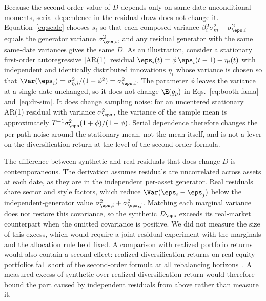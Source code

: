 Because the second-order value of $D$ depends only on same-date
unconditional moments, serial dependence in the residual draw does not
change it. Equation~\eqref{eq:scale} chooses $s_i$ so that each
composed variance $\beta_i^2\sigma_m^2+\sigma_{\eps,i}^2$ equals the
generator variance $\sigma_{\gen,i}^2$, and any residual generator
with the same same-date variances gives the same $D$. As an
illustration, consider a stationary first-order autoregressive
[AR(1)] residual $\eps_i(t) = \phi\, \eps_i(t-1) + \eta_i(t)$ with
independent and identically distributed innovations $\eta_i$ whose
variance is chosen so that
$\Var(\eps_i) = \sigma_{\eta,i}^2 / (1 - \phi^2) = \sigma_{\eps,i}^2$.
The parameter $\phi$ leaves the variance at a single date unchanged,
so it does not change $\E(g_p)$ in Eqs.~\eqref{eq:booth-fama}
and~\eqref{eq:dr-sim}. It does change sampling noise: for an
uncentered stationary AR(1) residual with variance $\sigma_\eps^2$,
the variance of the sample mean is approximately
$T^{-1}\sigma_\eps^2(1+\phi)/(1-\phi)$. Serial dependence therefore
changes the per-path noise around the stationary mean, not the mean
itself, and is not a lever on the diversification return at the level
of the second-order formula.

The difference between synthetic and real residuals that does change
$D$ is contemporaneous. The derivation assumes residuals are
uncorrelated across assets at each date, as they are in the
independent per-asset generator. Real residuals share sector and style
factors, which reduce $\Var(\eps_i-\eps_j)$ below the
independent-generator value $\sigma_{\eps,i}^2+\sigma_{\eps,j}^2$.
Matching each marginal variance does not restore this covariance, so
the synthetic $D_\eps$ exceeds its real-market counterpart when the
omitted covariance is positive. We did not measure the size of this
excess, which would require a joint-residual experiment with the
marginals and the allocation rule held fixed. A comparison with
realized portfolio returns would also contain a second effect:
realized diversification returns on real equity portfolios fall short
of the second-order formula at all rebalancing
horizons~\cite{boucheyNemtchinovWong2015}. A measured excess of
synthetic over realized diversification return would therefore bound
the part caused by independent residuals from above rather than
measure it.



